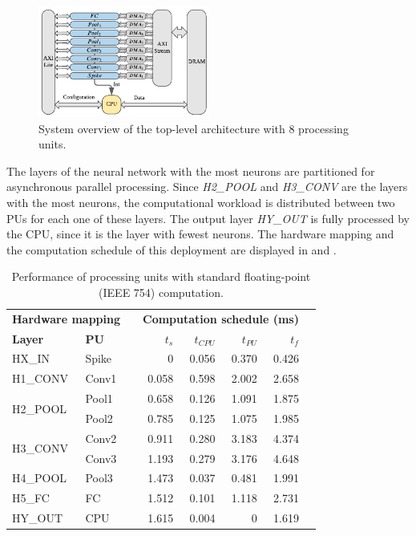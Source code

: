 \begin{figure}[t!]
	\centering
	\includegraphics[width=0.5\textwidth]{../figures/sbs_hw_experimental.pdf}
	\caption{System overview of the top-level architecture with 8 processing units.}
	\label{fig:hw_sbs_8_pu}
\end{figure}

The layers of the neural network with the most neurons are partitioned for asynchronous parallel processing. Since \emph{H2\_POOL} and \emph{H3\_CONV} are the layers with the most neurons, the computational workload is distributed between two PUs for each one of these layers. The output layer \emph{HY\_OUT} is fully processed by the CPU, since it is the layer with fewest neurons. The hardware mapping and the computation schedule of this deployment are displayed in  and .

\begin{table}[!t]\centering
	\caption{Performance of processing units with standard floating-point (IEEE 754) computation.}\label{tab:latency_fp}
	\scriptsize
	\begin{tabular}{llrrrrrr}\toprule
		\multicolumn{2}{c}{\textbf{Hardware mapping}} & &\multicolumn{4}{c}{\textbf{Computation schedule (ms)}} \\\cmidrule{1-2}\cmidrule{4-7}
		\textbf{Layer} &\textbf{PU} & &$t_s$ &$t_{CPU}$ &$t_{PU}$ &$t_f$ \\\midrule
		HX\_IN &Spike & &0 &0.056 &0.370 &0.426 \\
		H1\_CONV &Conv1 & &0.058 &0.598 &2.002 &2.658 \\
		\multirow{2}{*}{H2\_POOL}
		&Pool1 & &0.658 &0.126 &1.091 &1.875 \\
		&Pool2 & &0.785 &0.125 &1.075 &1.985 \\
		\multirow{2}{*}{H3\_CONV} 
		&Conv2 & &0.911 &0.280 &3.183 &4.374 \\
		&Conv3 & &1.193 &0.279 &3.176 &4.648 \\
		H4\_POOL &Pool3 & &1.473 &0.037 &0.481 &1.991 \\
		H5\_FC &FC & &1.512 &0.101 &1.118 &2.731 \\
		HY\_OUT &CPU & &1.615 &0.004 &0 &1.619 \\
		\bottomrule
	\end{tabular}
\end{table}


